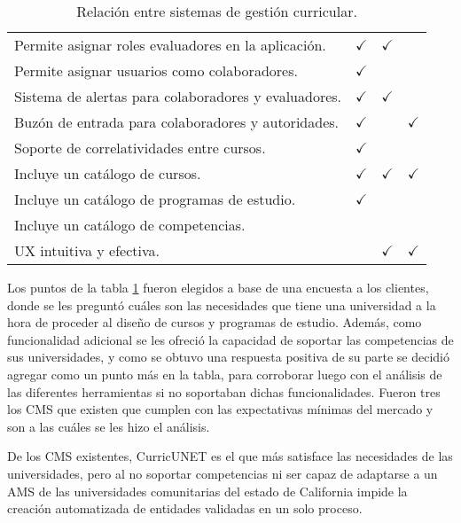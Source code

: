 \begin{table}[H]
{\begin{tabular}{lllccl}
		\multicolumn{3}{l}{Permite asignar roles evaluadores en la aplicación.}            & $\checkmark$                     & $\checkmark$          &              \\
		\multicolumn{3}{l}{Permite asignar usuarios como colaboradores.}                   & $\checkmark$                     &                       &              \\
		\multicolumn{3}{l}{Sistema de alertas para colaboradores y evaluadores.}           & $\checkmark$                     & $\checkmark$          &              \\
		\multicolumn{3}{l}{Buzón de entrada para colaboradores y autoridades.} 			   & $\checkmark$                     &                       & $\checkmark$ \\
		\multicolumn{3}{l}{Soporte de correlatividades entre cursos.}                      & $\checkmark$ 					  &						  &              \\
		\multicolumn{3}{l}{Incluye un catálogo de cursos.}                   		   	   & $\checkmark$					  &	$\checkmark$		  & $\checkmark$ \\
		\multicolumn{3}{l}{Incluye un catálogo de programas de estudio.}                   & $\checkmark$					  &	            		  &              \\
		\multicolumn{3}{l}{Incluye un catálogo de competencias.}                   	       & 								  &						  & 			 \\
		\multicolumn{3}{l}{UX intuitiva y efectiva.}     			   					   &                                  & $\checkmark$          & $\checkmark$ \\
		\bottomrule
	\end{tabular}
}
\caption{Relación entre sistemas de gestión curricular.}
\label{relacion-sistemas}
\end{table}

Los puntos de la tabla \ref{relacion-sistemas} fueron elegidos a base de una encuesta a los clientes, donde se les preguntó cuáles son las necesidades que tiene una universidad a la hora de proceder al diseño de cursos y programas de estudio. Además, como funcionalidad adicional se les ofreció la capacidad de soportar las competencias de sus universidades, y como se obtuvo una respuesta positiva de su parte se decidió agregar como un punto más en la tabla, para corroborar luego con el análisis de las diferentes herramientas si no soportaban dichas funcionalidades. Fueron tres los CMS que existen que cumplen con las expectativas mínimas del mercado y son a las cuáles se les hizo el análisis.

De los CMS existentes, CurricUNET es el que más satisface las necesidades de las universidades, pero al no soportar competencias ni ser capaz de adaptarse a un AMS de las universidades comunitarias del estado de California impide la creación automatizada de entidades validadas en un solo proceso.